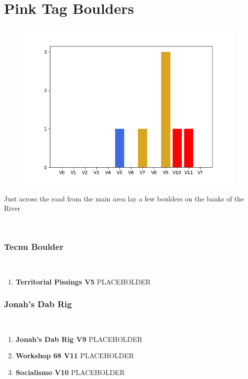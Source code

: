 \chapter{Pink Tag Boulders}\label{a:Pink Tag Boulders}
\lhead{\textcolor{\chapterColor}{\rule[-2pt]{\textwidth}{15pt}}}
\begin{figure}[h]
  \centering
    \includegraphics[width=\linewidth]{./maps/plots/Pink Tag Boulders.png}
\end{figure}
Just across the road from the main area lay a few boulders on the banks of the River

\

\subsection*{Tecnu Boulder}\label{bf:Tecnu Boulder}
\

\begin{enumerate}[]
	\item\label{rt:Territorial Pissings} \colorbox{RoyalBlue!20}{\textbf{Territorial Pissings V5  } }
	\newline PLACEHOLDER\
\end{enumerate}
\subsection*{Jonah's Dab Rig}\label{bf:Jonah's Dab Rig}
\

\begin{enumerate}[resume]
	\item\label{rt:Jonah's Dab Rig} \colorbox{Goldenrod!50}{\textbf{Jonah's Dab Rig V9  } }
	\newline PLACEHOLDER\
	\item\label{rt:Workshop 68} \colorbox{red!20}{\textbf{Workshop 68 V11  } }
	\newline PLACEHOLDER\
	\item\label{rt:Socialismo} \colorbox{red!20}{\textbf{Socialismo V10  } }
	\newline PLACEHOLDER\
\end{enumerate}

